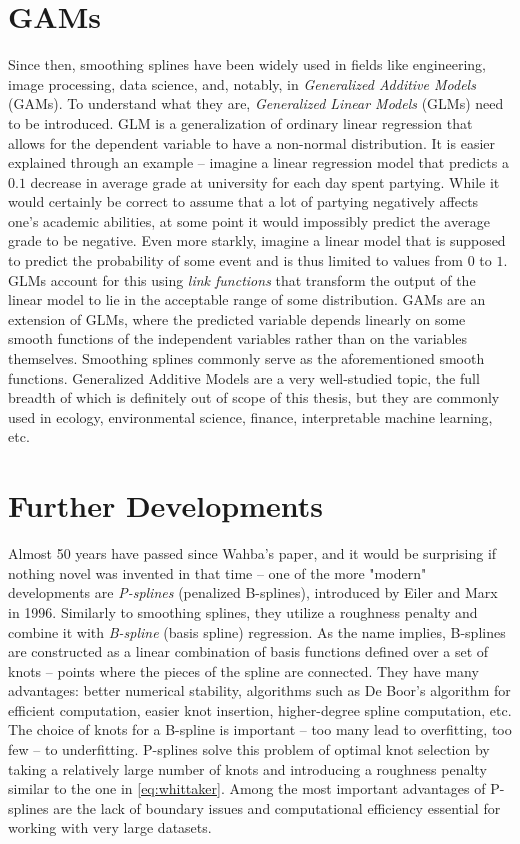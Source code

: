 \documentclass[11pt,leqno]{book}
\theoremstyle{definition}
\theoremstyle{plain}
\theoremstyle{definition}
\begin{document}
{\section{GAMs}
Since then, smoothing splines have been widely used in fields like engineering, image processing, data science, and, notably, in \textit{Generalized Additive Models} (GAMs). To understand what they are, \textit{Generalized Linear Models} (GLMs) need to be introduced. GLM is a generalization of ordinary linear regression that allows for the dependent variable to have a non-normal distribution. It is easier explained through an example -- imagine a linear regression model that predicts a $0.1$ decrease in average grade at university for each day spent partying. While it would certainly be correct to assume that a lot of partying negatively affects one's academic abilities, at some point it would impossibly predict the average grade to be negative. Even more starkly, imagine a linear model that is supposed to predict the probability of some event and is thus limited to values from $0$ to $1$. GLMs account for this using \textit{link functions} that transform the output of the linear model to lie in the acceptable range of some distribution. GAMs are an extension of GLMs, where the predicted variable depends linearly on some smooth functions of the independent variables rather than on the variables themselves. Smoothing splines commonly serve as the aforementioned smooth functions. Generalized Additive Models are a very well-studied topic, the full breadth of which is definitely out of scope of this thesis, but they are commonly used in ecology, environmental science, finance, interpretable machine learning, etc. 

\section{Further Developments}
Almost 50 years have passed since Wahba's paper, and it would be surprising if nothing novel was invented in that time -- one of the more "modern" developments are \textit{P-splines} (penalized B-splines), introduced by Eiler and Marx \cite{Pspline} in 1996. Similarly to smoothing splines, they utilize a roughness penalty and combine it with \textit{B-spline} (basis spline) regression. As the name implies, B-splines are constructed as a linear combination of basis functions defined over a set of knots -- points where the pieces of the spline are connected. They have many advantages: better numerical stability, algorithms such as De Boor's algorithm \cite{de1978practical} for efficient computation, easier knot insertion, higher-degree spline computation, etc. The choice of knots for a B-spline is important -- too many lead to overfitting, too few -- to underfitting. P-splines solve this problem of optimal knot selection by taking a relatively large number of knots and introducing a roughness penalty similar to the one in \eqref{eq:whittaker}. Among the most important advantages of P-splines are the lack of boundary issues and computational efficiency essential for working with very large datasets.

}
\end{document}
